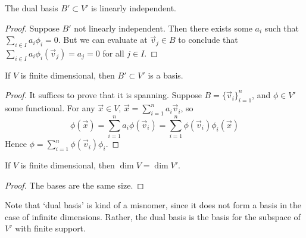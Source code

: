 \begin{lemma}
    The dual basis \(B' \subset V'\) is linearly independent.
\end{lemma}
\begin{proof}
    Suppose \(B'\) not linearly independent.
    Then there exists some \(a_i\) such that \(\sum_{i \in I} a_i \phi_i = 0\).
    But we can evaluate at \(\vec{v}_j \in B\) to conclude that
    \(\sum_{i \in I} a_i \phi_i(\vec{v}_j) = a_j = 0\) for all \(j \in I\).
\end{proof}
\begin{proposition}
    If \(V\) is finite dimensional,
    then \(B' \subset V'\) is a basis.
\end{proposition}
\begin{proof}
    It suffices to prove that it is spanning.
    Suppose \(B = {\{\vec{v}_i\}}_{i=1}^n\),
    and \(\phi \in V'\) some functional.
    For any \(\vec{x} \in V\),
    \(\vec{x} = \sum_{i=1}^n a_i \vec{v}_i\),
    so
    \begin{equation*}
        \phi(\vec{x}) = \sum_{i=1}^n a_i \phi(\vec{v}_i)
        = \sum_{i=1}^n \phi(\vec{v}_i) \phi_i(\vec{x})
    \end{equation*}
    Hence \(\phi = \sum_{i=1}^n \phi(\vec{v}_i) \phi_i\).
\end{proof}
\begin{corollary}
    If \(V\) is finite dimensional,
    then \(\dim V = \dim V'\).
\end{corollary}
\begin{proof}
    The bases are the same size.
\end{proof}
\begin{remark}
    Note that `dual basis' is kind of a misnomer,
    since it does not form a basis in the case of infinite dimensions.
    Rather, the dual basis is the basis for the subspace of \(V'\)
    with finite support.
\end{remark}

